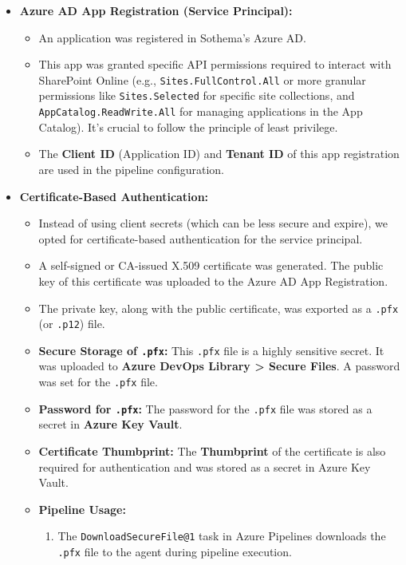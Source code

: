 \begin{itemize}
    \item \textbf{Azure AD App Registration (Service Principal):}
    \begin{itemize}
        \item An application was registered in Sothema's Azure AD.
        \item This app was granted specific API permissions required to interact with SharePoint Online (e.g., \texttt{Sites.FullControl.All} or more granular permissions like \texttt{Sites.Selected} for specific site collections, and \texttt{AppCatalog.ReadWrite.All} for managing applications in the App Catalog). It's crucial to follow the principle of least privilege.
        \item The \textbf{Client ID} (Application ID) and \textbf{Tenant ID} of this app registration are used in the pipeline configuration.
    \end{itemize}
    \item \textbf{Certificate-Based Authentication:}
    \begin{itemize}
        \item Instead of using client secrets (which can be less secure and expire), we opted for certificate-based authentication for the service principal.
        \item A self-signed or CA-issued X.509 certificate was generated. The public key of this certificate was uploaded to the Azure AD App Registration.
        \item The private key, along with the public certificate, was exported as a \texttt{.pfx} (or \texttt{.p12}) file.
        \item \textbf{Secure Storage of \texttt{.pfx}:} This \texttt{.pfx} file is a highly sensitive secret. It was uploaded to \textbf{Azure DevOps Library > Secure Files}. A password was set for the \texttt{.pfx} file.
        \item \textbf{Password for \texttt{.pfx}:} The password for the \texttt{.pfx} file was stored as a secret in \textbf{Azure Key Vault}.
        \item \textbf{Certificate Thumbprint:} The \textbf{Thumbprint} of the certificate is also required for authentication and was stored as a secret in Azure Key Vault.
        \item \textbf{Pipeline Usage:}
        \begin{enumerate}
            \item The \texttt{DownloadSecureFile@1} task in Azure Pipelines downloads the \texttt{.pfx} file to the agent during pipeline execution.

\end{enumerate}
\end{itemize}
\end{itemize}
